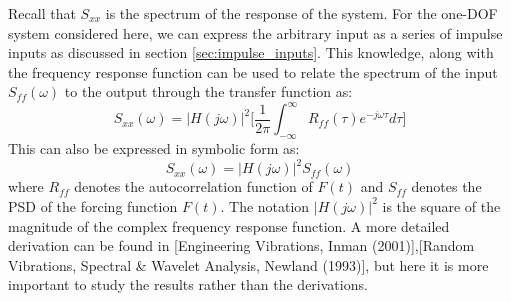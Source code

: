 \documentclass[12pt,letter]{article}
\numberwithin{ex}{section} %
\numberwithin{re}{section} %
\begin{document}
Recall that $S_{xx}$ is the spectrum of the response of the system. For the one-DOF system considered here, we can express the arbitrary input as a series of impulse inputs as discussed in section \ref{sec:impulse_inputs}. This knowledge, along with the frequency response function can be used to relate the spectrum of the input $S_{ff}(\omega)$ to the output through the transfer function as:
\begin{equation}
S_{xx}(\omega) =  |H(j\omega)|^2\Bigg[\frac{1}{2 \pi } \int_{-\infty}^{\infty} R_{ff}(\tau) e^{-j \omega \tau}d  \tau  \Bigg] 
\end{equation}
This can also be expressed in symbolic form as:
\begin{equation}
S_{xx}(\omega) =  |H(j\omega)|^2 S_{ff}(\omega)
\end{equation}
where $R_{ff}$ denotes the autocorrelation function of $F(t)$ and $S_{ff}$ denotes the PSD of the forcing function $F(t)$. The notation $|H(j\omega)|^2$ is the square of the magnitude of the complex frequency response function. A more detailed derivation can be found in [Engineering Vibrations, Inman (2001)],[Random Vibrations, Spectral \& Wavelet Analysis, Newland (1993)], but here it is more important to study the results rather than the derivations. 
\end{document}
